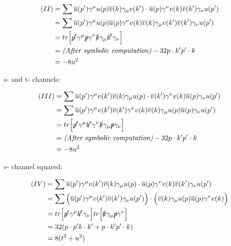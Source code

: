 \documentclass[11pt]{article}
\begin{document}
\begin{equation}
  \begin{split}
    (II) & = \sum \overline{u}(p') \gamma^\mu u(p) \overline{v}(k) \gamma_\mu v(k')
      \cdot \overline{u}(p) \gamma^\nu v(k) \overline{v}(k') \gamma_\nu u(p') \\
    & = \sum \overline{u}(p') \gamma^\mu u(p) \overline{u}(p) \gamma^\nu v(k)
      \overline{v}(k) \gamma_\mu v(k') \overline{v}(k') \gamma_\nu u(p') \\
    & = tr \Big [ \slashed{p'} \gamma^\mu \slashed{p} \gamma^\nu
                       \slashed{k} \gamma_\mu \slashed{k'} \gamma_\nu \Big ] \\
    & = \textit{(After symbolic computation)} -32 p \cdot k' p' \cdot k \\
    & = -8 u^2
  \end{split}
\end{equation}

\pagebreak

s- and t- channels:

\begin{equation}
  \begin{split}
    (III) & = \sum \overline{u}(p') \gamma^\mu v(k') \overline{v}(k) \gamma_\mu u(p)
      \cdot \overline{v}(k') \gamma^\nu v(k) \overline{u}(p) \gamma_\nu u(p') \\
    & = \sum \overline{u}(p') \gamma^\mu v(k') \overline{v}(k') \gamma^\nu v(k)
       \overline{v}(k) \gamma_\mu u(p) \overline{u}(p) \gamma_\nu u(p') \\
    & = tr \Big [ \slashed{p'} \gamma^\mu \slashed{k'} \gamma^\nu
      \slashed{k} \gamma_\mu \slashed{p} \gamma_\nu \Big ] \\
    & = \textit{(After symbolic computation)} -32 p \cdot k' p' \cdot k \\
    & = -8 u^2
  \end{split}
\end{equation}

s- channel squared:

\begin{equation}
  \begin{split}
    (IV) & = \sum \overline{u}(p') \gamma^\mu v(k') \overline{v}(k) \gamma_\mu u(p)
      \cdot \overline{u}(p) \gamma^\nu v(k) \overline{v}(k') \gamma_\nu u(p') \\
    & = \sum \Big ( \overline{u}(p') \gamma^\mu v(k')
                    \overline{v}(k') \gamma_\nu u(p') \Big )
       \cdot \Big ( \overline{v}(k) \gamma_\mu u(p) \overline{u}(p) \gamma^\nu v(k)
         \Big ) \\
    & = tr \Big [ \slashed{p'} \gamma^\mu \slashed{k'} \gamma_\nu \Big ]
          tr \Big [ \slashed{k} \gamma_\mu \slashed{p} \gamma^\nu \Big ] \\
    & = 32 ( p \cdot p' k \cdot k' + p \cdot k' p' \cdot k ) \\
    & = 8 ( t^2 + u^2 )
  \end{split}
\end{equation}
\end{document}
